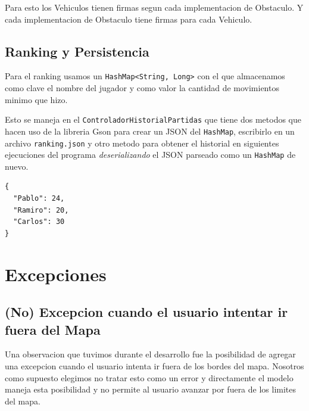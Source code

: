 \documentclass[titlepage,a4paper]{article}
\begin{document}
Para esto los Vehiculos tienen firmas segun cada implementacion de Obstaculo.
Y cada implementacion de Obstaculo tiene firmas para cada Vehiculo.

\subsection{Ranking y Persistencia}
\label{sec:org3d8da03}

Para el ranking usamos un \texttt{HashMap<String, Long>} con el que
almacenamos como clave el nombre del jugador y como valor la cantidad
de movimientos minimo que hizo.

Esto se maneja en el \texttt{ControladorHistorialPartidas} que tiene dos
metodos que hacen uso de la libreria Gson para crear un JSON del
\texttt{HashMap}, escribirlo en un archivo \texttt{ranking.json} y otro metodo para
obtener el historial en siguientes ejecuciones del programa
\emph{deserializando} el JSON parseado como un \texttt{HashMap} de nuevo.

\begin{verbatim}
{
  "Pablo": 24,
  "Ramiro": 20,
  "Carlos": 30
}
\end{verbatim}

\section{Excepciones}
\label{sec:orgc5c5dd2}
\subsection{(No) Excepcion cuando el usuario intentar ir fuera del Mapa}
\label{sec:orgc646474}

Una observacion que tuvimos durante el desarrollo fue la posibilidad
de agregar una excepcion cuando el usuario intenta ir fuera de los
bordes del mapa. Nosotros como supuesto elegimos no tratar esto como
un error y directamente el modelo maneja esta posibilidad y no permite
al usuario avanzar por fuera de los limites del mapa.
\end{document}
